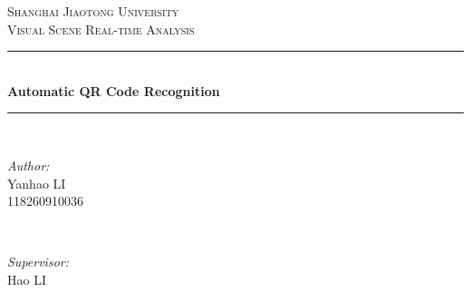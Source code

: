 \documentclass[10pt]{article}
\begin{document}
\begin{titlepage}

\newcommand{\HRule}{\rule{\linewidth}{0.5mm}} %

\center %


\textsc{\LARGE Shanghai Jiaotong University}\\[1.5cm] %
\textsc{\Large Visual Scene Real-time Analysis}\\[0.5cm] %


\HRule \\[0.4cm]
{ \huge \bfseries Automatic QR Code Recognition}\\[0.4cm] %
\HRule \\[1.5cm]


\begin{minipage}{0.4\textwidth}
\begin{flushleft} \large
\emph{Author:}\\
Yanhao LI\\118260910036\\
\end{flushleft}
\end{minipage}
~
\begin{minipage}{0.4\textwidth}
\begin{flushright} \large
\emph{Supervisor:} \\
Hao  \textsc{LI} \\%
\end{flushright}
\end{minipage}\\[2cm]


\end{titlepage}
\end{document}
